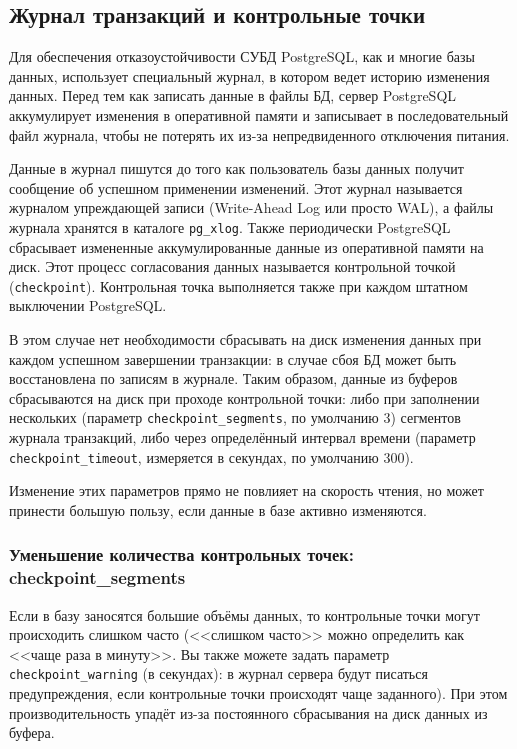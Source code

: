 \subsection{Журнал транзакций и контрольные точки}

Для обеспечения отказоустойчивости СУБД PostgreSQL, как и многие базы данных, использует специальный журнал, в котором ведет историю изменения данных. Перед тем как записать данные в файлы БД, сервер PostgreSQL аккумулирует изменения в оперативной памяти и записывает в последовательный файл журнала, чтобы не потерять их из-за непредвиденного отключения питания.

Данные в журнал пишутся до того как пользователь базы данных получит сообщение об успешном применении изменений. Этот журнал называется журналом упреждающей записи (Write-Ahead Log или просто WAL), а файлы журнала хранятся в каталоге \lstinline!pg_xlog!. Также периодически PostgreSQL сбрасывает измененные аккумулированные данные из оперативной памяти на диск. Этот процесс согласования данных называется контрольной точкой (\lstinline!checkpoint!). Контрольная точка выполняется также при каждом штатном выключении PostgreSQL.

В этом случае нет необходимости сбрасывать на диск изменения данных при каждом успешном завершении транзакции: в случае сбоя БД может быть восстановлена по записям в журнале. Таким образом, данные из буферов сбрасываются на диск при проходе контрольной точки: либо при заполнении нескольких (параметр \lstinline!checkpoint_segments!, по умолчанию 3) сегментов журнала транзакций, либо через определённый интервал времени (параметр \lstinline!checkpoint_timeout!, измеряется в секундах, по умолчанию 300).

Изменение этих параметров прямо не повлияет на скорость чтения, но может принести большую пользу, если данные в базе активно изменяются.

\subsubsection{Уменьшение количества контрольных точек: checkpoint\_segments}

Если в базу заносятся большие объёмы данных, то контрольные точки могут происходить слишком часто (<<слишком часто>> можно определить как <<чаще раза в минуту>>. Вы также можете задать параметр \lstinline!checkpoint_warning! (в секундах): в журнал сервера будут писаться предупреждения, если контрольные точки происходят чаще заданного). При этом производительность упадёт из-за постоянного сбрасывания на диск данных из буфера.

